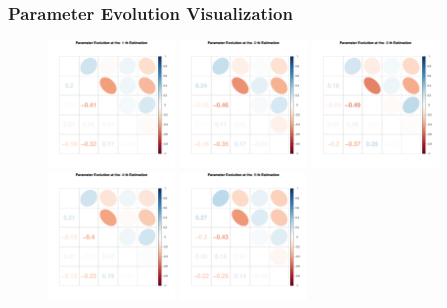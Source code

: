 \clearpage

\subsubsection{Parameter Evolution Visualization}

\begin{figure}[h]
\centering
\includegraphics[width=0.3\textwidth,height=0.18\textheight]{Chapters/05MCMCOU/plots/paraEvolution/corMatrix1.pdf}
\includegraphics[width=0.3\textwidth,height=0.18\textheight]{Chapters/05MCMCOU/plots/paraEvolution/corMatrix2.pdf}
\includegraphics[width=0.3\textwidth,height=0.18\textheight]{Chapters/05MCMCOU/plots/paraEvolution/corMatrix3.pdf}
\includegraphics[width=0.3\textwidth,height=0.18\textheight]{Chapters/05MCMCOU/plots/paraEvolution/corMatrix4.pdf}
\includegraphics[width=0.3\textwidth,height=0.18\textheight]{Chapters/05MCMCOU/plots/paraEvolution/corMatrix5.pdf}

\end{figure}
